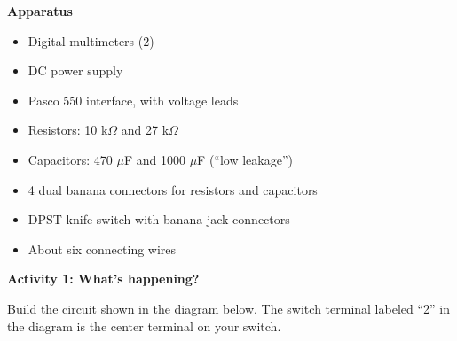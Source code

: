 \makelabheader %

\bigskip
\textbf{Apparatus}

\begin{itemize}[nosep]
\item Digital multimeters (2) 
\item DC power supply 
\item Pasco 550 interface, with voltage leads
\item Resistors: 10 k$\Omega$ and 27 k$\Omega$
\item Capacitors: 470 $\mu$F and 1000 $\mu$F (``low leakage'')
\item 4 dual banana connectors for resistors and capacitors
\item DPST knife switch with banana jack connectors
\item About six connecting wires
\end{itemize}

\bigskip
\textbf{Activity 1: What's happening?}

Build the circuit shown in the diagram below.  The switch terminal labeled ``2'' in the diagram is the center terminal on your switch.

